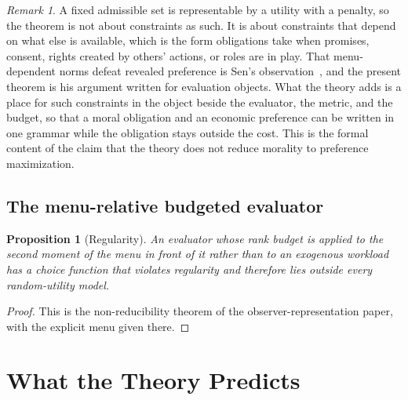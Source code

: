 \documentclass[11pt]{article}
\newtheorem{proposition}{Proposition}
\theoremstyle{definition}
\theoremstyle{remark}
\newtheorem*{remark}{Remark}
\begin{document}
\begin{remark}
A fixed admissible set is representable by a utility with a penalty, so the theorem is not about constraints as such.
It is about constraints that depend on what else is available, which is the form obligations take when promises, consent, rights created by others' actions, or roles are in play.
That menu-dependent norms defeat revealed preference is Sen's observation~\cite{sen1971,sen1993}, and the present theorem is his argument written for evaluation objects.
What the theory adds is a place for such constraints in the object beside the evaluator, the metric, and the budget, so that a moral obligation and an economic preference can be written in one grammar while the obligation stays outside the cost.
This is the formal content of the claim that the theory does not reduce morality to preference maximization.
\end{remark}

\subsection{The menu-relative budgeted evaluator}

\begin{proposition}[Regularity]
\label{prop:reg}
An evaluator whose rank budget is applied to the second moment of the menu in front of it rather than to an exogenous workload has a choice function that violates regularity and therefore lies outside every random-utility model.
\end{proposition}

\begin{proof}
This is the non-reducibility theorem of the observer-representation paper, with the explicit menu given there.
\end{proof}

\section{What the Theory Predicts}
\label{sec:predict}
\end{document}
